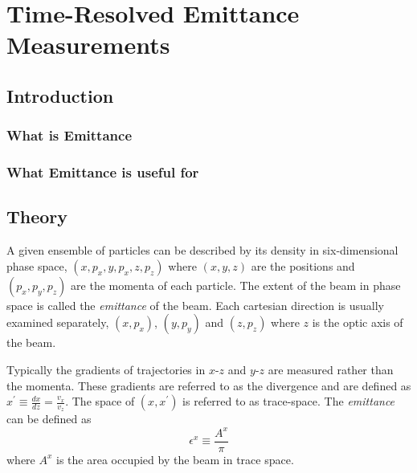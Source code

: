 \chapter{Time-Resolved Emittance Measurements}

\section{Introduction}

\subsection{What is Emittance}
 

\subsection{What Emittance is useful for}

\section{Theory}

A given ensemble of particles can be described by its density in six-dimensional phase space, $(x, p_x, y, p_x, z, p_z)$ where $(x, y, z)$ are the positions and $(p_x, p_y, p_z)$ are the momenta of each particle.
The extent of the beam in phase space is called the \emph{emittance} of the beam.
Each cartesian direction is usually examined separately, $(x, p_x)$, $(y, p_y)$ and $(z, p_z)$ where $z$ is the optic axis of the beam.

Typically the gradients of trajectories in $x$-$z$ and $y$-$z$ are measured rather than the momenta.
These gradients are referred to as the divergence and are defined as $x^\prime \equiv \frac{dx}{dz} = \frac{v_x}{v_z}$.
The space of $(x, x^\prime)$ is referred to as trace-space. The \emph{emittance} can be defined as
\begin{equation}
\epsilon^x \equiv \frac{A^x}{\pi}
\end{equation}
where $A^x$ is the area occupied by the beam in trace space.

